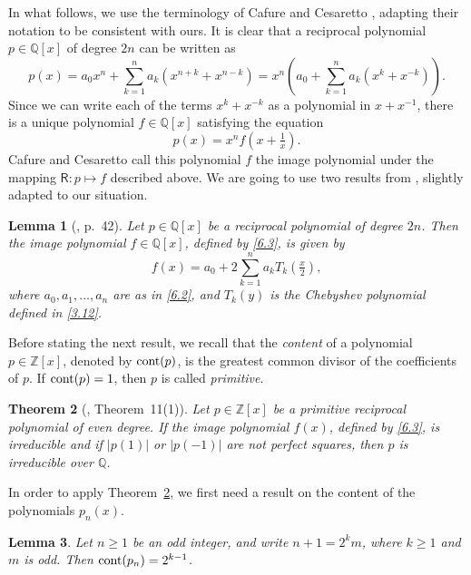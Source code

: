 \documentclass{amsart}
\theoremstyle{plain}
\newtheorem{theorem}{Theorem}[section]
\newtheorem{lemma}[theorem]{Lemma}
\numberwithin{equation}{section}
\begin{document}
In what follows, we use the terminology of Cafure and Cesaretto \cite{CC},
adapting their notation to be consistent with ours. It is clear that a 
reciprocal polynomial $p\in{\mathbb Q}[x]$ of degree $2n$ can be written as
\begin{equation}\label{6.2}
p(x)=a_0x^n+\sum_{k=1}^n a_k\left(x^{n+k}+x^{n-k}\right)
=x^n\left(a_0+\sum_{k=1}^n a_k\left(x^k+x^{-k}\right)\right).
\end{equation}
Since we can write each of the terms $x^k+x^{-k}$ as a polynomial in
$x+x^{-1}$, there is a unique polynomial $f\in{\mathbb Q}[x]$ satisfying the
equation
\begin{equation}\label{6.3}
p(x) = x^nf(x+\tfrac{1}{x}).
\end{equation}
Cafure and Cesaretto \cite{CC} call this polynomial $f$ the image polynomial
under the mapping ${\mathsf R}:p\mapsto f$ described above. We are going to use
two results from \cite{CC}, slightly adapted to our situation.

\begin{lemma}[\cite{CC}, p.~42]\label{lem:6.2}
Let $p\in{\mathbb Q}[x]$ be a reciprocal polynomial of degree $2n$. Then the
image polynomial $f\in{\mathbb Q}[x]$, defined by \eqref{6.3}, is given by
\begin{equation}\label{6.4}
f(x)=a_0+2\sum_{k=1}^n a_kT_k(\tfrac{x}{2}),
\end{equation}
where $a_0, a_1,\ldots, a_n$ are as in \eqref{6.2}, and $T_k(y)$ is the
Chebyshev polynomial defined in \eqref{3.12}.
\end{lemma}

Before stating the next result, we recall that the {\it content\/} of a 
polynomial $p\in{\mathbb Z}[x]$, denoted by ${\rm cont}(p)$, is the greatest
common divisor of the coefficients of $p$. If ${\rm cont}(p)=1$, then $p$ is
called {\it primitive\/}.

\begin{theorem}[\cite{CC}, Theorem~11(1)]\label{thm:6.3}
Let $p\in{\mathbb Z}[x]$ be a primitive reciprocal polynomial of even degree.
If the image polynomial $f(x)$, defined by \eqref{6.3}, is irreducible and if
$|p(1)|$ or $|p(-1)|$ are not perfect squares, then $p$ is irreducible over
$\mathbb Q$.
\end{theorem}

In order to apply Theorem~\ref{thm:6.3}, we first need a result on the
content of the polynomials $p_n(x)$. 

\begin{lemma}\label{lem:6.4}
Let $n\geq 1$ be an odd integer, and write $n+1=2^km$, where $k\geq 1$ and $m$ 
is odd. Then ${\rm cont}(p_n)=2^{k-1}$.
\end{lemma}
\end{document}

